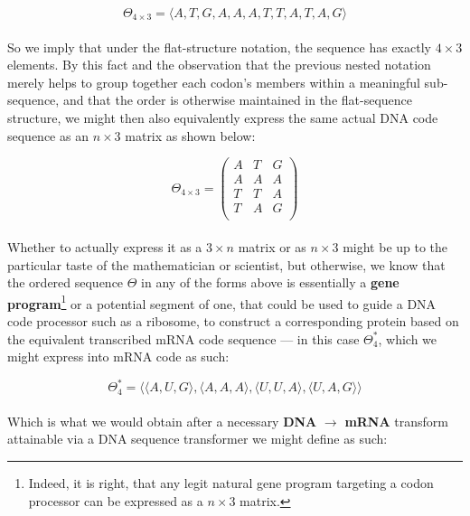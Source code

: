 \documentclass[a4paper, 18pt]{book} %
\begin{document}
 \begin{equation}
\label{EQ5}
\Theta_{4 \times 3} = \langle  A, T, G, A, A, A, T, T, A, T, A, G \rangle
\end{equation}\\

So we imply that under the flat-structure notation, the sequence has exactly $4 \times 3$ elements. By this fact and the observation that the previous nested notation merely helps to group together each codon's members within a meaningful sub-sequence, and that the order is otherwise maintained in the flat-sequence structure, we might then also equivalently express the same actual DNA code sequence as an $n \times 3$ matrix as shown below:

 \begin{equation}
\label{EQ5a}
\Theta_{4 \times 3} = \begin{pmatrix}
A& T& G\\
A& A& A\\
T& T& A\\
T& A & G \\
\end{pmatrix}
\end{equation}\\


Whether to actually express it as a $3 \times n$ matrix or as $n \times 3$ might be up to the particular taste of the mathematician or scientist, but otherwise, we know that the ordered sequence $\Theta$ in any of the forms above is essentially a \textbf{gene program}\footnote{Indeed, it is right, that any legit natural gene program targeting a codon processor can be expressed as a $n \times 3$ matrix.} or a potential segment of one, that could be used to guide a DNA code processor such as a ribosome, to construct a corresponding protein based on the equivalent transcribed mRNA code sequence --- in this case $\Theta_4^*$, which we might express into mRNA code as such:


 \begin{equation}
\label{EQ6}
\Theta_4^* = \langle \langle A, U, G \rangle, \langle A, A, A \rangle, \langle U, U, A \rangle, \langle U, A, G \rangle \rangle
\end{equation}\\

Which is what we would obtain after a necessary \textbf{DNA} $\rightarrow$ \textbf{mRNA} transform attainable via a DNA sequence transformer we might define as such:\\
\end{document}
